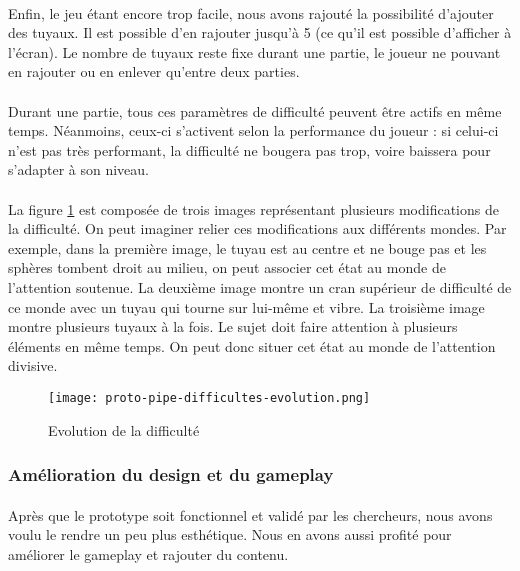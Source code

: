 \paragraph{}Enfin, le jeu étant encore trop facile, nous avons rajouté la possibilité d'ajouter des tuyaux. Il est possible d'en rajouter jusqu'à 5 (ce qu'il est possible d'afficher à l'écran). Le
nombre de tuyaux reste fixe durant une partie, le joueur ne pouvant en rajouter ou en enlever qu'entre deux parties.

\paragraph{}Durant une partie, tous ces paramètres de difficulté peuvent être actifs en même temps. Néanmoins, ceux-ci s'activent selon la performance du joueur : si celui-ci n'est pas très
performant, la difficulté ne bougera pas trop, voire baissera pour s'adapter à son niveau.

\paragraph{}La figure \ref{ProtoPipeDifficultes} est composée de trois images représentant plusieurs modifications de la difficulté. On peut imaginer relier ces modifications aux
différents mondes. Par exemple, dans la première image, le tuyau est au centre et ne bouge pas et les sphères tombent droit au milieu, on peut associer cet état au monde de l'attention
soutenue. La deuxième image montre un cran supérieur de difficulté de ce monde avec un tuyau qui tourne sur lui-même et vibre. La troisième image montre plusieurs tuyaux à la fois.
Le sujet doit faire attention à plusieurs éléments en même temps. On peut donc situer cet état au monde de l'attention divisive.

\begin{figure}[H]
    \begin{center}
    \texttt{[image: proto-pipe-difficultes-evolution.png]}
    \end{center}
    \caption{Evolution de la difficulté}
\label{ProtoPipeDifficultes}
\end{figure}

\newpage
\subsubsection{Amélioration du design et du gameplay}

\paragraph{}Après que le prototype soit fonctionnel et validé par les chercheurs, nous avons voulu le rendre un peu plus esthétique. Nous en avons aussi profité pour améliorer le
gameplay et rajouter du contenu. \\


